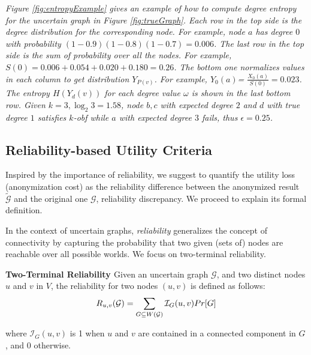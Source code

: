 {\emph{Figure \ref{fig:entropyExample}  gives an example of how to compute degree entropy for the uncertain graph in Figure \ref{fig:trueGraph}. Each row in the top side is the degree distribution for the corresponding node. For example, node $a$ has degree $0$ with probability $(1-0.9)(1-0.8)(1-0.7)=0.006$. The last row in the top side is the sum of probability over all the nodes. For example, $S(0)=0.006+0.054+0.020+0.180=0.26$.
The bottom one normalizes values in each column to get distribution $Y_{P(v)}$. For example, $Y_{0}(a)$= $\frac{X_{0}(a)}{S(0)}=0.023$. The entropy $H(Y_d(v))$ for each degree value $\omega$ is shown in the last bottom row. Given $k=3, \log_{2}{3}=1.58$, node $b,c$ with expected degree $2$ and $d$ with true degree $1$ satisfies $k$-obf while $a$ with expected degree $3$ fails, thus $\epsilon=0.25$.}

\subsection{Reliability-based Utility Criteria}
Inspired by the importance of reliability, we suggest to quantify the utility loss (anonymization cost) as the reliability difference between the anonymized result $\tilde{\mathcal{G}}$ and the original one $\mathcal{G}$, reliability discrepancy. We proceed to explain its formal definition. 

In the context of uncertain graphs, \emph{reliability} generalizes the concept of connectivity by  capturing the probability that two given (sets of) nodes are reachable over all possible worlds. We focus on two-terminal reliability. 
\begin{definition}
    \textbf{Two-Terminal Reliability \cite{Colbourn_Colbourn_1987}}  Given an uncertain graph $\mathcal{G}$, and two distinct nodes $u$ and $v$ in $V$, the reliability for two nodes $(u,v)$ is defined as follows:
        \vj
        \begin{equation*}
                R_{u,v}(\mathcal{G})= \sum_{G \subseteq W(\mathcal{G})}  \mathcal{I}_{G}(u,v) Pr[G] 
        \svj
        \end{equation*}
     
    where $\mathcal{I}_{G}(u,v)$ is 1 when $u$ and $v$ are contained in a connected component in $G$, and 0 otherwise.     
    \label{d:reliability}
\end{definition}

}

